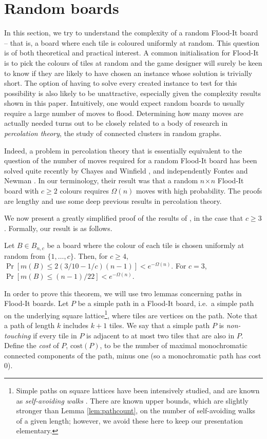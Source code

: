 \documentclass[a4paper,11pt]{llncs}
\newcounter{l}
\renewcommand{\geq}{\geqslant}
\renewcommand{\leq}{\leqslant}
\newcommand{\recdim}[2]{$#1$$\mspace{1mu}$$\times$$\mspace{1mu}$$#2$}
\begin{document}
\section{Random boards} \label{sec:random}


In this section, we try to understand the complexity of a random Flood-It board -- that is, a board where each tile is coloured uniformly at random. This question is of both theoretical and practical interest. A common initialisation for Flood-It is to pick the colours of tiles at random and the game designer will surely be keen to know if they are likely to have chosen an instance whose solution is trivially short. The option of having to solve every created instance to test for this possibility is also likely to be unattractive, especially given the complexity results shown in this paper.  Intuitively, one would expect random boards to usually require a large number of moves to flood. Determining how many moves are actually needed turns out to be closely related to a body of research in {\em percolation theory}, the study of connected clusters in random graphs.

Indeed, a problem in percolation theory that is essentially equivalent to the question of the number of moves required for a random Flood-It board has been solved quite recently by Chayes and Winfield \cite{CW1993:random}, and independently Fontes and Newman \cite{FN1993:random}. In our terminology, their result was that a random \recdim{n}{n} Flood-It board with $c \geq 2$ colours requires $\Omega(n)$ moves with high probability. The proofs are lengthy and use some deep previous results in percolation theory.

We now present a greatly simplified proof of the results of \cite{CW1993:random,FN1993:random}, in the case that $c \geq 3$. Formally, our result is as follows.

\begin{theorem}
    \label{thm:random}
    Let $B \in B_{n,c}$ be a board where the colour of each tile is chosen uniformly at random from $\{1,\dots,c\}$. Then, for $c \geq 4$, $\Pr[m(B) \leq 2(3/10-1/c)(n-1)] < e^{-\Omega(n)}$. For $c=3$, $\Pr[m(B) \leq (n-1)/22] < e^{-\Omega(n)}$.
\end{theorem}

In order to prove this theorem, we will use two lemmas concerning paths in Flood-It boards. Let $P$ be a simple path in a Flood-It board, i.e.\ a simple path on the underlying square lattice\footnote{Simple paths on square lattices have been intensively studied, and are known as {\em self-avoiding walks} \cite{MS1996:SAW}. There are known upper bounds, which are slightly stronger than Lemma \ref{lem:pathcount}, on the number of self-avoiding walks of a given length; however, we avoid these here to keep our presentation elementary.}, where tiles are vertices on the path. Note that a path of length $k$ includes $k+1$ tiles. We say that a simple path $P$ is {\em non-touching} if every tile in $P$ is adjacent to at most two tiles that are also in $P$. Define the {\em cost} of $P$, $\text{cost}(P)$, to be the number of maximal monochromatic connected components of the path, minus one (so a monochromatic path has cost 0).
\end{document}
